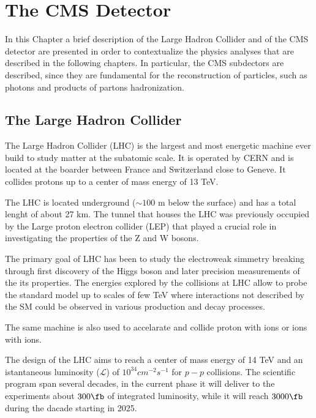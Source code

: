 \chapter{The CMS Detector}
\label{chapter:cms}

In this Chapter a brief description of the Large Hadron Collider and of the CMS detector are
presented in order to contextualize the physics analyses that are described in the following chapters.
In particular, the CMS subdectors are described, since they are fundamental for the reconstruction of particles,
such as photons and products of partons hadronization.

\section{The Large Hadron Collider}

The Large Hadron Collider (LHC) is the largest and most energetic machine ever build to study
matter at the subatomic scale. It is operated by CERN and is located at the boarder between France and
Switzerland close to Geneve. It collides protons up to a center of mass energy of 13 TeV.

The LHC is located underground ($\sim 100$ m below the surface) and has a total lenght of about 27 km.
The tunnel that houses the LHC was previously occupied by the Large proton electron collider (LEP) that
played a crucial role in investigating the properties of the Z and W bosons.

The primary goal of LHC has been to study the electroweak simmetry breaking through first discovery of the Higgs boson and later
precision measurements of the its properties.
The energies explored by the collisions at LHC allow to probe the standard model up to scales of few TeV where
interactions not described by the SM could be observed in various production and decay processes.

The same machine is also used to accelarate and collide proton with ions or ions with ions.

The design of the LHC aims to reach a center of mass energy of 14 TeV and an istantaneous luminosity ($\mathcal{L}$)
of $10^{34}cm^{-2}s^{-1}$ for $p-p$ collisions. The scientific program span several decades, in the current phase it will
deliver to the experiments about $300 \fb$ of integrated luminosity, while it will reach $3000 \fb$ during the dacade
starting in 2025.

